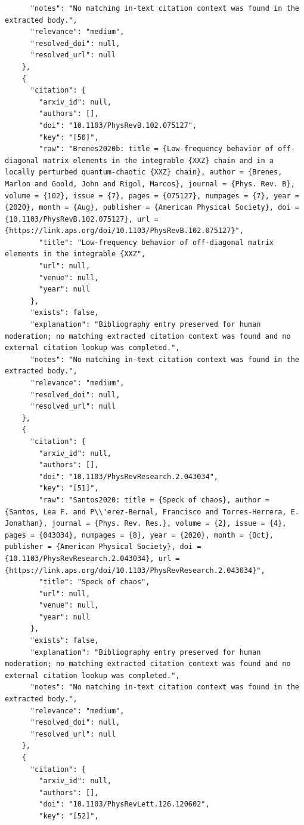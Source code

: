 \documentclass[11pt]{article}
\begin{document}
\begin{verbatim}
      "notes": "No matching in-text citation context was found in the extracted body.",
      "relevance": "medium",
      "resolved_doi": null,
      "resolved_url": null
    },
    {
      "citation": {
        "arxiv_id": null,
        "authors": [],
        "doi": "10.1103/PhysRevB.102.075127",
        "key": "[50]",
        "raw": "Brenes2020b: title = {Low-frequency behavior of off-diagonal matrix elements in the integrable {XXZ} chain and in a locally perturbed quantum-chaotic {XXZ} chain}, author = {Brenes, Marlon and Goold, John and Rigol, Marcos}, journal = {Phys. Rev. B}, volume = {102}, issue = {7}, pages = {075127}, numpages = {7}, year = {2020}, month = {Aug}, publisher = {American Physical Society}, doi = {10.1103/PhysRevB.102.075127}, url = {https://link.aps.org/doi/10.1103/PhysRevB.102.075127}",
        "title": "Low-frequency behavior of off-diagonal matrix elements in the integrable {XXZ",
        "url": null,
        "venue": null,
        "year": null
      },
      "exists": false,
      "explanation": "Bibliography entry preserved for human moderation; no matching extracted citation context was found and no external citation lookup was completed.",
      "notes": "No matching in-text citation context was found in the extracted body.",
      "relevance": "medium",
      "resolved_doi": null,
      "resolved_url": null
    },
    {
      "citation": {
        "arxiv_id": null,
        "authors": [],
        "doi": "10.1103/PhysRevResearch.2.043034",
        "key": "[51]",
        "raw": "Santos2020: title = {Speck of chaos}, author = {Santos, Lea F. and P\\'erez-Bernal, Francisco and Torres-Herrera, E. Jonathan}, journal = {Phys. Rev. Res.}, volume = {2}, issue = {4}, pages = {043034}, numpages = {8}, year = {2020}, month = {Oct}, publisher = {American Physical Society}, doi = {10.1103/PhysRevResearch.2.043034}, url = {https://link.aps.org/doi/10.1103/PhysRevResearch.2.043034}",
        "title": "Speck of chaos",
        "url": null,
        "venue": null,
        "year": null
      },
      "exists": false,
      "explanation": "Bibliography entry preserved for human moderation; no matching extracted citation context was found and no external citation lookup was completed.",
      "notes": "No matching in-text citation context was found in the extracted body.",
      "relevance": "medium",
      "resolved_doi": null,
      "resolved_url": null
    },
    {
      "citation": {
        "arxiv_id": null,
        "authors": [],
        "doi": "10.1103/PhysRevLett.126.120602",
        "key": "[52]",

\end{verbatim}
\end{document}
